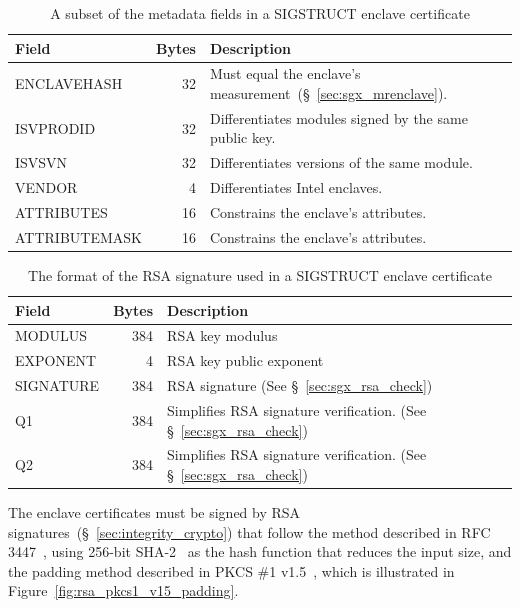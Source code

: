 \begin{table}[hbt]
  \centering
  \begin{tabularx}{\columnwidth}{| l | r | X |}
  \hline
  \textbf{Field} & \textbf{Bytes} & \textbf{Description} \\
  \hline
  ENCLAVEHASH & 32 & Must equal the enclave's
                     measurement~(\S~\ref{sec:sgx_mrenclave}). \\
  \hline
  ISVPRODID & 32 & Differentiates modules signed by the same public key. \\
  \hline
  ISVSVN & 32 & Differentiates versions of the same module. \\
  \hline
  VENDOR & 4 & Differentiates Intel enclaves. \\
  \hline
  ATTRIBUTES & 16 & Constrains the enclave's attributes. \\
  \hline
  ATTRIBUTEMASK & 16 & Constrains the enclave's attributes. \\
  \hline
  \end{tabularx}
  \caption{
    A subset of the metadata fields in a SIGSTRUCT enclave certificate
  }
  \label{fig:sgx_sigstruct_info}
\end{table}

\begin{table}[hbt]
  \centering
  \begin{tabularx}{\columnwidth}{| l | r | X |}
  \hline
  \textbf{Field} & \textbf{Bytes} & \textbf{Description} \\
  \hline
  MODULUS & 384 & RSA key modulus \\
  \hline
  EXPONENT & 4 & RSA key public exponent \\
  \hline
  SIGNATURE & 384 & RSA signature (See \S~\ref{sec:sgx_rsa_check}) \\
  \hline
  Q1 & 384 & Simplifies RSA signature verification.
             (See \S~\ref{sec:sgx_rsa_check}) \\
  \hline
  Q2 & 384 & Simplifies RSA signature verification.
             (See \S~\ref{sec:sgx_rsa_check}) \\
  \hline
  \end{tabularx}
  \caption{
    The format of the RSA signature used in a SIGSTRUCT enclave certificate
  }
  \label{fig:sgx_sigstruct_rsa}
\end{table}

The enclave certificates must be signed by RSA
signatures~(\S~\ref{sec:integrity_crypto}) that follow the method described in
RFC 3447~\cite{jonsson2003pkcsv21}, using 256-bit SHA-2~\cite{fips2015shs} as
the hash function that reduces the input size, and the padding method described
in PKCS \#1 v1.5~\cite{kaliski1998pkcs1v15}, which is illustrated in
Figure~\ref{fig:rsa_pkcs1_v15_padding}.

